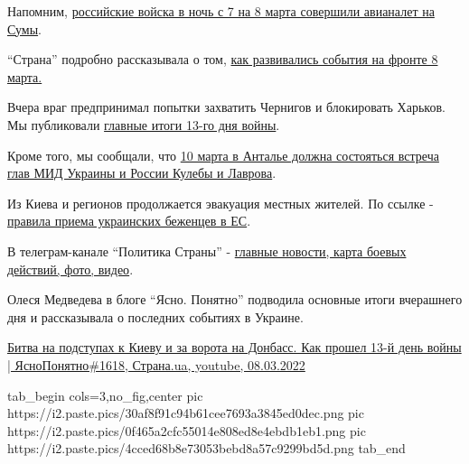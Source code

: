 
Напомним, \href{https://strana.news/news/380725-rossijskie-vojska-nochju-sovershili-avianalet-na-sumy-unichtozheny-zhilye-doma-pohibli-ne-menee-10-chelovek.html}{%
российские войска в ночь с 7 на 8 марта совершили авианалет на Сумы}.

\enquote{Страна} подробно рассказывала о том, \href{https://strana.news/news/380734-vojna-v-ukraine-8-marta-trinadtsatyj-den-karta-boevykh-dejstvij-obnovljaetsja.html}{%
как развивались события на фронте 8
марта.}

Вчера враг предпринимал попытки захватить Чернигов и блокировать Харьков. Мы
публиковали \href{https://strana.news/news/380875-kak-proshel-v-ukraine-13-den-vojny-vechernjaja-svodka-vsu-za-8-marta.html}{главные итоги 13-го дня войны}.

Кроме того, мы сообщали, что \href{https://strana.news/news/380703-kuleba-podtverdil-hotovnost-vstretitsja-s-lavrovym.html}{%
10 марта в Анталье должна состояться встреча глав МИД Украины и России Кулебы и Лаврова}.

Из Киева и регионов продолжается эвакуация местных жителей. По ссылке - \href{https://strana.news/news/379789-cheho-zhdat-ukrainskim-bezhentsam-v-evrope-.html}{%
правила приема украинских беженцев в ЕС}.

В телеграм-канале \enquote{Политика Страны} - \href{https://t.me/stranaua}{главные новости, карта боевых действий,
фото, видео}.

Олеся Медведева в блоге \enquote{Ясно. Понятно} подводила основные итоги вчерашнего дня
и рассказывала о последних событиях в Украине. 

\href{https://youtu.be/XwUVvlnzzkc}{%
Битва на подступах к Киеву и за ворота на Донбасс. Как прошел 13-й день войны | ЯсноПонятно\#1618, %
Страна.ua, youtube, 08.03.2022
}

\ifcmt
  tab_begin cols=3,no_fig,center
     pic https://i2.paste.pics/30af8f91c94b61cee7693a3845ed0dec.png
		 pic https://i2.paste.pics/0f465a2cfc55014e808ed8e4ebdb1eb1.png
		 pic https://i2.paste.pics/4cced68b8e73053bebd8a57c9299bd5d.png
  tab_end
\fi

